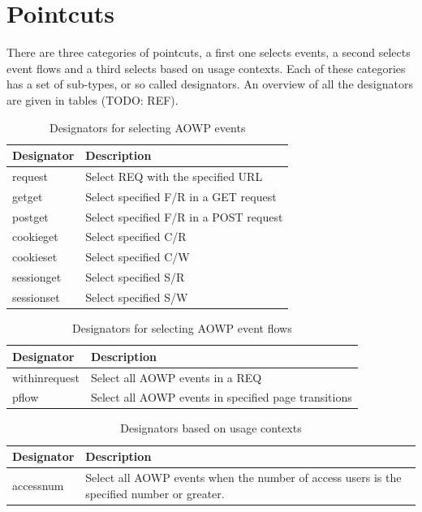 \documentclass[a4paper]{report}
\begin{document}
\section{Pointcuts}
There are three categories of pointcuts, a first one selects events, a second selects event flows and a third selects based on usage contexts. Each of these categories has a set of sub-types, or so called designators. An overview of all the designators are given in tables (TODO: REF).
\begin{table}
\centering
\begin{tabular}{l|p{7cm}}
\hline
Designator & Description\\
\hline
\hline
request & Select REQ with the specified URL\\
\hline
getget & Select specified F/R in a GET request\\
\hline
postget & Select specified F/R in a POST request\\
\hline
cookieget & Select specified C/R\\
\hline
cookieset & Select specified C/W\\
\hline
sessionget & Select specified S/R\\
\hline
sessionset & Select specified S/W\\
\hline
\end{tabular}
\caption{Designators for selecting AOWP events}
\label{tab:Designators_AOWP_Events}
\end{table}
\begin{table}
\centering
\begin{tabular}{l|p{7cm}}
\hline
Designator & Description\\
\hline
\hline
withinrequest & Select all AOWP events in a REQ\\
\hline
pflow & Select all AOWP events in specified page transitions\\
\hline
\end{tabular}
\caption{Designators for selecting AOWP event flows}
\label{tab:Designators_AOWP_Flows}
\end{table}
\begin{table}
\centering
\begin{tabular}{l|p{7cm}}
\hline
Designator & Description\\
\hline
\hline
accessnum & Select all AOWP events when the number of access users is the specified number or greater.\\
\hline
\end{tabular}
\caption{Designators based on usage contexts}
\label{tab:Designators_AOWP_Contexts}
\end{table}
\end{document}
